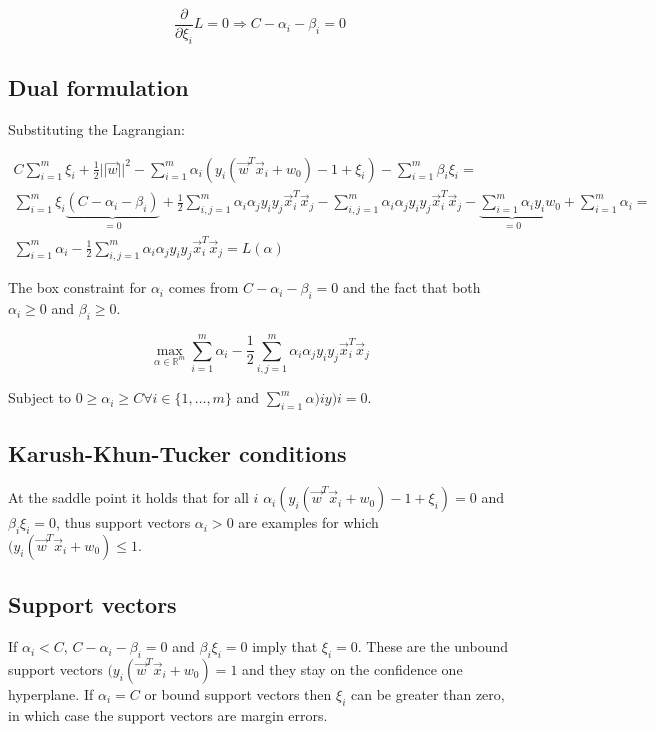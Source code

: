 	$$\frac{\partial}{\partial\xi_i}L = 0 \Rightarrow C - \alpha_i -\beta_i = 0$$

	\subsection{Dual formulation}
	Substituting the Lagrangian:

	\begin{align*}
		C\sum\limits_{i=1}^m\xi_i+\frac{1}{2}||\vec{w}||^2-\sum\limits_{i=1}^m\alpha_i(y_i(\vec{w}^T\vec{x}_i+w_0)-1+\xi_i) - \sum\limits_{i=1}^m\beta_i\xi_i=\\
		\sum\limits_{i=1}^m\xi_i\underbrace{(C-\alpha_i-\beta_i)}_{=0}+\frac{1}{2}\sum\limits_{i,j=1}^m\alpha_i\alpha_jy_iy_j\vec{x}_i^T\vec{x}_j-\sum\limits_{i,j=1}^m\alpha_i\alpha_jy_iy_j\vec{x}_i^T\vec{x}_j-\underbrace{\sum\limits_{i=1}^m\alpha_iy_i}_{=0}w_0+\sum\limits_{i=1}^m\alpha_i=\\
		\sum\limits_{i=1}^m\alpha_i-\frac{1}{2}\sum\limits_{i,j=1}^m\alpha_i\alpha_jy_iy_j\vec{x}^T_i\vec{x}_j= L(\alpha)
	\end{align*}

	The box constraint for $\alpha_i$ comes from $C-\alpha_i-\beta_i=0$ and the fact that both $\alpha_i\ge 0$ and $\beta_i\ge 0$.

	$$\max\limits_{\alpha\in\mathbb{R}^m}\sum\limits_{i=1}^m\alpha_i -\frac{1}{2}\sum\limits_{i,j=1}^m\alpha_i\alpha_jy_iy_j\vec{x}_i^T\vec{x}_j$$

	Subject to $0\ge \alpha_i\ge C \forall i\in\{1, \dots, m\}$ and $\sum\limits_{i=1}^m\alpha)iy)i=0$.

	\subsection{Karush-Khun-Tucker conditions}
	At the saddle point it holds that for all $i$ $\alpha_i(y_i(\vec{w}^T\vec{x}_i + w_0)-1+\xi_i)=0$ and $\beta_i\xi_i = 0$, thus support vectors $\alpha_i > 0$ are examples for which $(y_i(\vec{w}^T\vec{x}_i+w_0)\le 1$.

	\subsection{Support vectors}
	If $\alpha_i< C$, $C-\alpha_i-\beta_i=0$ and $\beta_i\xi_i=0$ imply that $\xi_i=0$.
	These are the unbound support vectors $(y_i(\vec{w}^T\vec{x}_i+w_0)=1$ and they stay on the confidence one hyperplane.
	If $\alpha_i=C$ or bound support vectors then $\xi_i$ can be greater than zero, in which case the support vectors are margin errors.

